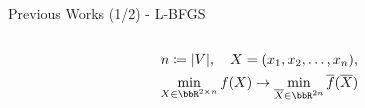 \documentclass[dvipdfmx,13pt,aspectratio=169]{beamer}
\newcommand{\red}[1]{\textcolor{red}{#1}}
\newcommand{\gray}[1]{\textcolor{gray}{#1}}
\newcommand{\defeq}{\coloneqq}
\newif\ifShowHidden
\begin{document}
\begin{frame}{Previous Works (1/2) - L-BFGS}
\begin{columns}
\begin{column}{0.4\columnwidth}
\begin{figure}[htbp]
        \end{figure}
        \begin{gather*}
          n\defeq \abs{V}, \quad
          X = \qty( x_1, x_2, \dots, x_n ),\\
          \min_{X \in \bbR^{2\times n}} f(X) \to \min_{\overline{X} \in \bbR^{2n}} \overline{f}(\overline{X})
        \end{gather*}
      \end{column}
    \end{columns}
  \end{frame}
\fi


\ifShowHidden
  \begin{frame}{Previous Works (2/2) - Simulated Annealing}
    \begin{columns}
      \begin{column}{0.5\columnwidth}
        \large{\textbf{Simulated Annealing (SA)}}~\cite{ghassemitoosiSimulatedAnnealingPreProcessing2016}\\
        \quad Providing an initial placement\\
        \quad Effective for addressing ``twist'' issues.\\[1.5em]
        \textbf{Limitations}\\
        \quad Restricted to unweighted graphs.\\
        \quad Limited to circle placement.\\
        \quad Inefficient due to random swapping.\\
        \quad Ignored sparsity of graphs.\\[1.5em]
        \textbf{\red{Our Aim}}\\
        \quad \red{Improve the strategy.}\\
        \quad \red{Extend the applicability.}
      \end{column}
      \begin{column}{0.5\columnwidth}
        \begin{mini*}
          {X \in \bbR^{2 \times n}}
          {\sum_{\{i,j\}\in E \cup E_2} \abs{\angle(x_i, x_j)},}
          {}
          {}
          \addConstraint{x_i}{\in Q^\mathrm{circle} \quad}{\text{for $1 \leq i \leq n$}}
          \addConstraint{x_i}{\neq x_j \quad}{\text{for $1 \leq i < j \leq n$}.}
        \end{mini*}
        \gray{\scriptsize{$Q^\mathrm{circle} \defeq \qty{(\cos(2\pi i/n), \sin(2\pi i/n)) \mid 1 \leq i \leq n}$\\
            $E_2$: a set of vertex pairs with a shortest path distance equal to 2. \textbf{$\abs{E_2}$ could be $\Theta(n^2)$}.\\
            $\angle(a, b)$: the angle between the lines from the origin to the points $a$ and $b$.}}
      \end{column}
    \end{columns}
  \end{frame}
\fi
\end{document}
